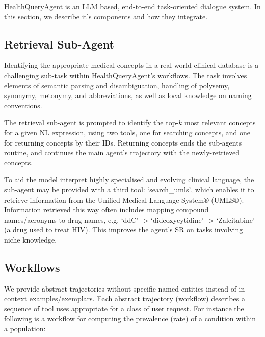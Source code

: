 \documentclass[11pt]{article}
\begin{document}
HealthQueryAgent is an LLM based, end-to-end task-oriented dialogue system.
In this section, we describe it's components and how they integrate.

\subsection{Retrieval Sub-Agent}
Identifying the appropriate medical concepts in a real-world clinical database is a challenging sub-task within HealthQueryAgent's workflows.
The task involves elements of semantic parsing and disambiguation, handling of polysemy, synonymy, metonymy, and abbreviations, as well as local knowledge on naming conventions.

The retrieval sub-agent is prompted to identify the top-$k$ most relevant concepts for a given NL expression, using two tools, one for searching concepts, and one for returning concepts by their IDs.
Returning concepts ends the sub-agents routine, and continues the main agent's trajectory with the newly-retrieved concepts.

To aid the model interpret highly specialised and evolving clinical language, the sub-agent may be provided with a third tool: `search\_umls', which enables it to retrieve information from the Unified Medical Language System® (UMLS®).
Information retrieved this way often includes mapping compound names/acronyms to drug names, e.g. `ddC' -> `dideoxycytidine' -> `Zalcitabine' (a drug used to treat HIV).
This improves the agent's SR on tasks involving niche knowledge.

\subsection{Workflows}

We provide abstract trajectories without specific named entities instead of in-context examples/exemplars.
Each abstract trajectory (workflow) describes a sequence of tool uses appropriate for a class of user request.
For instance the following is a workflow for computing the prevalence (rate) of a condition within a population:
\end{document}
